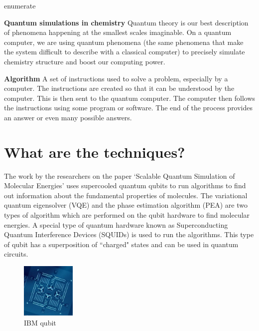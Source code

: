 enumerate\documentclass[14pt,landscape,color=UCLdarkred,margin=3cm]{uclposter}
\begin{document}
\begin{multicols}{3}
\begin{highlightbox}
\textbf{Quantum simulations in chemistry} Quantum theory is our best description of phenomena happening at the smallest scales imaginable. On a quantum computer, we are using quantum phenomena (the same phenomena that make the system difficult to describe with a classical computer) to precisely simulate chemistry structure and boost our computing power.
\end{highlightbox}

\begin{highlightbox}
\textbf{Algorithm} A set of instructions used to solve a problem, especially by a computer. The instructions are created so that it can be understood by the computer. This is then sent to the quantum computer. The computer then follows the instructions using some program or software. The end of the process provides an answer or even many possible answers.
\end{highlightbox}

\columnbreak

\section*{What are the techniques?}
The work by the researchers on the paper `Scalable Quantum Simulation of Molecular Energies' uses supercooled quantum qubits to run algorithms to find out information about the fundamental properties of molecules.
The variational quantum eigensolver (VQE) and the phase estimation algorithm (PEA) are two types of algorithm which are performed on the qubit hardware to find molecular energies. A special type of quantum hardware known as Superconducting Quantum Interference Devices (SQUIDs) is used to run the algorithms. This type of qubit has a superposition of ``charged" states and can be used in quantum circuits.
\\
\begin{figure}[H]
  \begin{center}
\setlength{\fboxsep}{0.5em}
  \begin{minipage}[c]{9em}
  \begin{center}
  \includegraphics[width=7em]{4_Qubit.png}
    \caption{IBM qubit}
  \end{center}
    

\end{minipage}
\end{center}
\end{figure}
\end{multicols}
\end{document}
